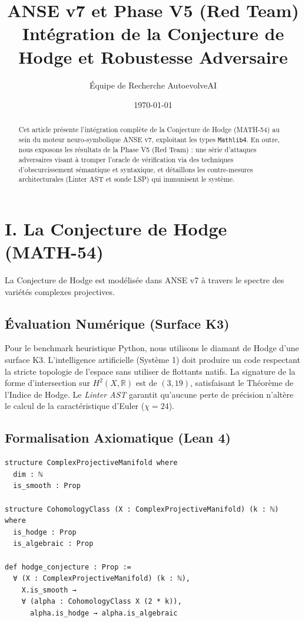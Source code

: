 \documentclass[11pt, a4paper]{article}
\title{\textbf{ANSE v7 et Phase V5 (Red Team)}\\ \Large Intégration de la Conjecture de Hodge et Robustesse Adversaire}
\author{Équipe de Recherche AutoevolveAI}
\date{\today}
\begin{document}
\maketitle

\begin{abstract}
Cet article présente l'intégration complète de la Conjecture de Hodge (MATH-54) au sein du moteur neuro-symbolique ANSE v7, exploitant les types \texttt{Mathlib4}. En outre, nous exposons les résultats de la Phase V5 (Red Team) : une série d'attaques adversaires visant à tromper l'oracle de vérification via des techniques d'obscurcissement sémantique et syntaxique, et détaillons les contre-mesures architecturales (Linter AST et sonde LSP) qui immunisent le système.
\end{abstract}

\section{I. La Conjecture de Hodge (MATH-54)}

La Conjecture de Hodge est modélisée dans ANSE v7 à travers le spectre des variétés complexes projectives.

\subsection{Évaluation Numérique (Surface K3)}
Pour le benchmark heuristique Python, nous utilisons le diamant de Hodge d'une surface K3. L'intelligence artificielle (Système 1) doit produire un code respectant la stricte topologie de l'espace sans utiliser de flottants natifs.
La signature de la forme d'intersection sur $H^2(X, \mathbb{R})$ est de $(3, 19)$, satisfaisant le Théorème de l'Indice de Hodge. Le \textit{Linter AST} garantit qu'aucune perte de précision n'altère le calcul de la caractéristique d'Euler ($\chi = 24$).

\subsection{Formalisation Axiomatique (Lean 4)}
\begin{lstlisting}[language=Lean]
structure ComplexProjectiveManifold where
  dim : ℕ
  is_smooth : Prop

structure CohomologyClass (X : ComplexProjectiveManifold) (k : ℕ) where
  is_hodge : Prop
  is_algebraic : Prop

def hodge_conjecture : Prop :=
  ∀ (X : ComplexProjectiveManifold) (k : ℕ),
    X.is_smooth →
    ∀ (alpha : CohomologyClass X (2 * k)),
      alpha.is_hodge → alpha.is_algebraic
\end{lstlisting}
\end{document}
